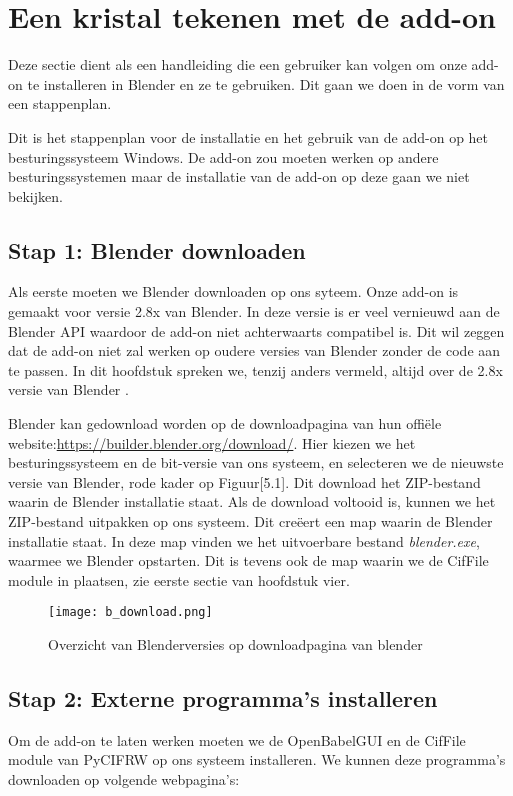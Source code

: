 \section{Een kristal tekenen met de add-on}
Deze sectie dient als een handleiding die een gebruiker kan volgen om onze add-on te installeren in Blender en ze te gebruiken. Dit gaan we doen in de vorm van een stappenplan. 
\par
Dit is het stappenplan voor de installatie en het gebruik van de add-on op het besturingssysteem Windows. De add-on zou moeten werken op andere besturingssystemen maar de installatie van de add-on op deze gaan we niet bekijken. 

\subsection{Stap 1: Blender downloaden}
Als eerste moeten we Blender downloaden op ons syteem. Onze add-on is gemaakt voor versie 2.8x van Blender. In deze versie is er veel vernieuwd aan de Blender API waardoor de add-on niet achterwaarts compatibel is. Dit wil zeggen dat de add-on niet zal werken op oudere versies van Blender zonder de code aan te passen. In dit hoofdstuk spreken we, tenzij anders vermeld, altijd over de 2.8x versie van Blender .  
\par
Blender kan gedownload worden op de downloadpagina van hun offiële website:\url{https://builder.blender.org/download/}. Hier kiezen we het besturingssysteem en de bit-versie van ons systeem, en selecteren we de nieuwste versie van Blender, rode kader op Figuur[5.1].  Dit download het ZIP-bestand waarin de Blender installatie staat. Als de download voltooid is, kunnen we het ZIP-bestand uitpakken op ons systeem. Dit creëert een map waarin de Blender installatie staat. In deze map vinden we het uitvoerbare bestand \textit{blender.exe}, waarmee we Blender opstarten. Dit is tevens ook de map waarin we de CifFile module in plaatsen, zie eerste sectie van hoofdstuk vier.      

\begin{figure}[h]
\begin{center}
\texttt{[image: b\_download.png]}
\caption{Overzicht van Blenderversies op downloadpagina van blender}
\end{center}
\end{figure}
 
\subsection{Stap 2: Externe programma's installeren}
Om de add-on te laten werken moeten we de OpenBabelGUI en de CifFile module van PyCIFRW op ons systeem installeren. We kunnen deze programma's downloaden op volgende webpagina's:

